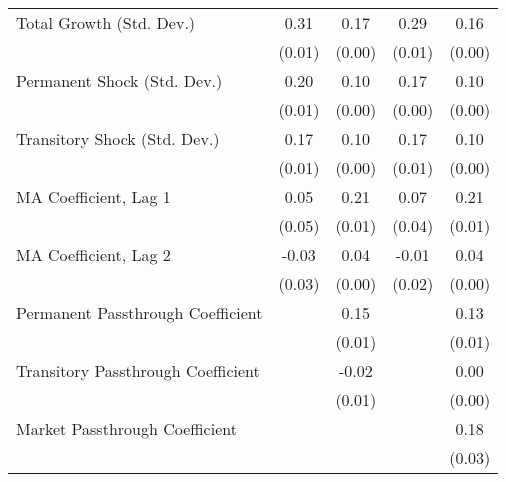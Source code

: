 \begin{tabular}{lcccc}
Total Growth (Std. Dev.) & 0.31 & 0.17 & 0.29 & 0.16 \\
  & {(\footnotesize 0.01)} & {(\footnotesize 0.00)} & {(\footnotesize 0.01)} & {(\footnotesize 0.00)} \\[5pt]
Permanent Shock (Std. Dev.) & 0.20 & 0.10 & 0.17 & 0.10 \\
  & {(\footnotesize 0.01)} & {(\footnotesize 0.00)} & {(\footnotesize 0.00)} & {(\footnotesize 0.00)} \\[5pt]
Transitory Shock (Std. Dev.) & 0.17 & 0.10 & 0.17 & 0.10 \\
  & {(\footnotesize 0.01)} & {(\footnotesize 0.00)} & {(\footnotesize 0.01)} & {(\footnotesize 0.00)} \\[5pt]
MA Coefficient, Lag 1 & 0.05 & 0.21 & 0.07 & 0.21 \\
  & {(\footnotesize 0.05)} & {(\footnotesize 0.01)} & {(\footnotesize 0.04)} & {(\footnotesize 0.01)} \\[5pt]
MA Coefficient, Lag 2 & -0.03 & 0.04 & -0.01 & 0.04 \\
  & {(\footnotesize 0.03)} & {(\footnotesize 0.00)} & {(\footnotesize 0.02)} & {(\footnotesize 0.00)} \\[5pt]
Permanent Passthrough Coefficient &  & 0.15 &  & 0.13 \\
  &  & {(\footnotesize 0.01)} &  & {(\footnotesize 0.01)} \\[5pt]
Transitory Passthrough Coefficient &  & -0.02 &  & 0.00 \\
  &  & {(\footnotesize 0.01)} &  & {(\footnotesize 0.00)} \\[5pt]
Market Passthrough Coefficient &  &  &  & 0.18 \\
  &  &  &  & {(\footnotesize 0.03)} \\
\midrule 
\bottomrule 
\end{tabular}
